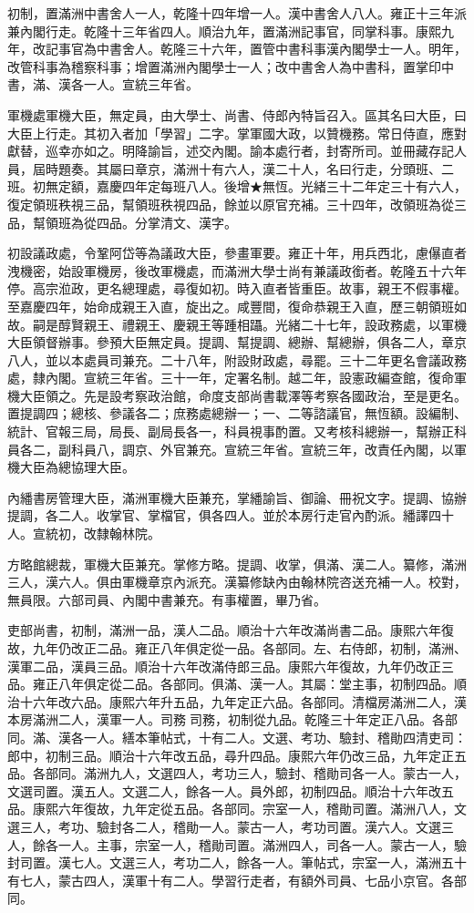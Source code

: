 \begin{pinyinscope}
初制，置滿洲中書舍人一人，乾隆十四年增一人。漢中書舍人八人。雍正十三年派兼內閣行走。乾隆十三年省四人。順治九年，置滿洲記事官，同掌科事。康熙九年，改記事官為中書舍人。乾隆三十六年，置管中書科事漢內閣學士一人。明年，改管科事為稽察科事；增置滿洲內閣學士一人；改中書舍人為中書科，置掌印中書，滿、漢各一人。宣統三年省。

軍機處軍機大臣，無定員，由大學士、尚書、侍郎內特旨召入。區其名曰大臣，曰大臣上行走。其初入者加「學習」二字。掌軍國大政，以贊機務。常日侍直，應對獻替，巡幸亦如之。明降諭旨，述交內閣。諭本處行者，封寄所司。並冊藏存記人員，屆時題奏。其屬曰章京，滿洲十有六人，漢二十人，名曰行走，分頭班、二班。初無定額，嘉慶四年定每班八人。後增★無恆。光緒三十二年定三十有六人，復定領班秩視三品，幫領班秩視四品，餘並以原官充補。三十四年，改領班為從三品，幫領班為從四品。分掌清文、漢字。

初設議政處，令鞏阿岱等為議政大臣，參畫軍要。雍正十年，用兵西北，慮儤直者洩機密，始設軍機房，後改軍機處，而滿洲大學士尚有兼議政銜者。乾隆五十六年停。高宗涖政，更名總理處，尋復如初。時入直者皆重臣。故事，親王不假事權。至嘉慶四年，始命成親王入直，旋出之。咸豐間，復命恭親王入直，歷三朝領班如故。嗣是醇賢親王、禮親王、慶親王等踵相躡。光緒二十七年，設政務處，以軍機大臣領督辦事。參預大臣無定員。提調、幫提調、總辦、幫總辦，俱各二人，章京八人，並以本處員司兼充。二十八年，附設財政處，尋罷。三十二年更名會議政務處，隸內閣。宣統三年省。三十一年，定署名制。越二年，設憲政編查館，復命軍機大臣領之。先是設考察政治館，命度支部尚書載澤等考察各國政治，至是更名。置提調四；總核、參議各二；庶務處總辦一；一、二等諮議官，無恆額。設編制、統計、官報三局，局長、副局長各一，科員視事酌置。又考核科總辦一，幫辦正科員各二，副科員八，調京、外官兼充。宣統三年省。宣統三年，改責任內閣，以軍機大臣為總協理大臣。

內繙書房管理大臣，滿洲軍機大臣兼充，掌繙諭旨、御論、冊祝文字。提調、協辦提調，各二人。收掌官、掌檔官，俱各四人。並於本房行走官內酌派。繙譯四十人。宣統初，改隸翰林院。

方略館總裁，軍機大臣兼充。掌修方略。提調、收掌，俱滿、漢二人。纂修，滿洲三人，漢六人。俱由軍機章京內派充。漢纂修缺內由翰林院咨送充補一人。校對，無員限。六部司員、內閣中書兼充。有事權置，畢乃省。

吏部尚書，初制，滿洲一品，漢人二品。順治十六年改滿尚書二品。康熙六年復故，九年仍改正二品。雍正八年俱定從一品。各部同。左、右侍郎，初制，滿洲、漢軍二品，漢員三品。順治十六年改滿侍郎三品。康熙六年復故，九年仍改正三品。雍正八年俱定從二品。各部同。俱滿、漢一人。其屬：堂主事，初制四品。順治十六年改六品。康熙六年升五品，九年定正六品。各部同。清檔房滿洲二人，漢本房滿洲二人，漢軍一人。司務司務，初制從九品。乾隆三十年定正八品。各部同。滿、漢各一人。繕本筆帖式，十有二人。文選、考功、驗封、稽勛四清吏司：郎中，初制三品。順治十六年改五品，尋升四品。康熙六年仍改三品，九年定正五品。各部同。滿洲九人，文選四人，考功三人，驗封、稽勛司各一人。蒙古一人，文選司置。漢五人。文選二人，餘各一人。員外郎，初制四品。順治十六年改五品。康熙六年復故，九年定從五品。各部同。宗室一人，稽勛司置。滿洲八人，文選三人，考功、驗封各二人，稽勛一人。蒙古一人，考功司置。漢六人。文選三人，餘各一人。主事，宗室一人，稽勛司置。滿洲四人，司各一人。蒙古一人，驗封司置。漢七人。文選三人，考功二人，餘各一人。筆帖式，宗室一人，滿洲五十有七人，蒙古四人，漢軍十有二人。學習行走者，有額外司員、七品小京官。各部同。


\end{pinyinscope}
